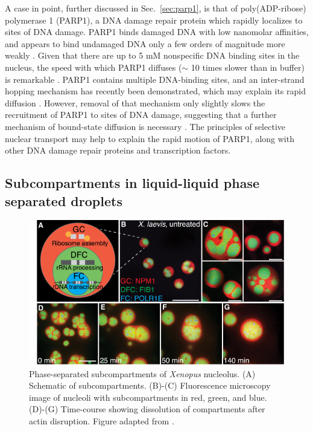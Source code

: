 A case in point, further discussed in Sec.~\ref{sec:parp1}, is that of poly(ADP-ribose) polymerase 1 (PARP1), a DNA damage repair protein which rapidly localizes to sites of DNA damage.  PARP1 binds damaged DNA with low nanomolar affinities, and appears to bind undamaged DNA only a few orders of magnitude more weakly \cite{sukhanova16}.  Given that there are up to 5 mM nonspecific DNA binding sites in the nucleus, the speed with which PARP1 diffuses ($\sim$ 10 times slower than in buffer) is remarkable \cite{iwahara13}.  PARP1 contains multiple DNA-binding sites, and an inter-strand hopping mechanism has recently been demonstrated, which may explain its rapid diffusion \cite{rudolph18}.  However, removal of that mechanism only slightly slows the recruitment of PARP1 to sites of DNA damage, suggesting that a further mechanism of bound-state diffusion is necessary \cite{mahadevan18}.  The principles of selective nuclear transport may help to explain the rapid motion of PARP1, along with other DNA damage repair proteins and transcription factors.


\subsection{Subcompartments in liquid-liquid phase separated droplets}

\begin{figure}
\centering
\includegraphics[width=0.8\linewidth]{figs/ch01/feric16.pdf}
\caption[Phase-separated subcompartments of the nucleolus.]{ Phase-separated subcompartments of \textit{Xenopus} nucleolus. (A) Schematic of subcompartments. (B)-(C) Fluorescence microscopy image of nucleoli with subcompartments in red, green, and blue. (D)-(G) Time-course showing dissolution of compartments after actin disruption. Figure adapted from \cite{feric16}.}
\label{fig:nucleolus}
\end{figure}

